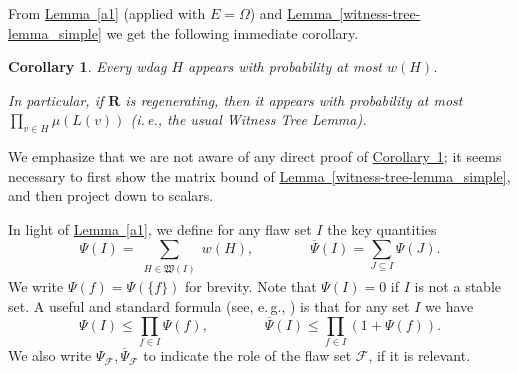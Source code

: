 \documentclass[11pt]{article}
\newcommand{\expref}[2]{\texorpdfstring{\hyperref[#2]{#1~\ref{#2}}}{#1~\ref{#2}}}
\newtheorem{corollary}[theorem]{Corollary}
\newcommand{\ie}{i.\,e.}
\newcommand{\eg}{e.\,g.}
\begin{document}
{}From  %
%
%
%
\expref{Lemma}{a1}  %
%
(applied with $E = \Omega$) and \expref{Lemma}{witness-tree-lemma_simple} we get
the following immediate corollary. %
\begin{corollary}
\label{bndcord0}
%
Every  %
wdag $H$ appears with probability at most $ w(H)$. 

In particular, if $\mathbf R$ is regenerating, then it appears with probability at most $\prod_{v \in H} \mu(L(v))$ (\ie, the usual Witness Tree Lemma).
\end{corollary}

We emphasize that we are not aware of any direct proof of \expref{Corollary}{bndcord0}; it seems necessary to first show the matrix bound of \expref{Lemma}{witness-tree-lemma_simple}, and then project down to scalars.  
  
In light of \expref{Lemma}{a1}, we define for any flaw set $I$ the key quantities
$$
\Psi(I) = \sum_{\substack{H \in \mathfrak W(I)}} w(H), \qquad \qquad \overline \Psi(I) = \sum_{J \subseteq I} \Psi(J).
$$
  We write $\Psi(f) = \Psi( \{f \})$ for brevity.  Note that $\Psi(I) = 0$ if $I$ is not a stable set. A useful and standard formula (see, \eg, \cite[Claim 59]{HV}) is that for any set $I$ we have $$
  \Psi(I) \leq \prod_{f \in I} \Psi(f), \qquad \qquad \overline \Psi(I) \leq \prod_{f \in I} (1 + \Psi(f)).
  $$
 We also write $\Psi_{\mathcal F}, \overline \Psi_{\mathcal F}$ to indicate the role of the flaw set $\mathcal F$, if it is relevant.  
  
\end{document}
